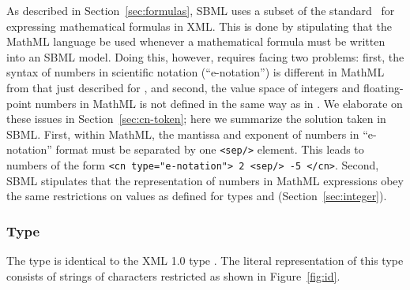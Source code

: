 As described in Section~\ref{sec:formulas}, SBML uses a subset of
the \mathmltwo standard~\citep{w3c:2000b} for expressing
mathematical formulas in XML.  This is done by stipulating that
the MathML language be used whenever a mathematical formula must
be written into an SBML model.  Doing this, however, requires
facing two problems: first, the syntax of numbers in scientific
notation (``e-notation'') is different in MathML from that just
described for , and second, the value space of
integers and floating-point numbers in MathML is not defined in
the same way as in \xmlschemaone.  We elaborate on these issues in
Section~\ref{sec:cn-token}; here we summarize the solution taken
in SBML.  First, within MathML, the mantissa and exponent of
numbers in ``e-notation'' format must be separated by one
\texttt{<sep/>} element.  This leads to numbers of the form
\texttt{<cn type="e-notation"> 2 <sep/> -5 </cn>}.  Second, SBML
stipulates that the representation of numbers in MathML
expressions obey the same restrictions on values as defined for
types  and 
(Section~\ref{sec:integer}).


\subsubsection{Type }
\label{sec:id}

The \xmlschemaone type  is identical to the XML 1.0
type .  The literal representation of this type
consists of strings of characters restricted as shown in
Figure~\ref{fig:id}.


